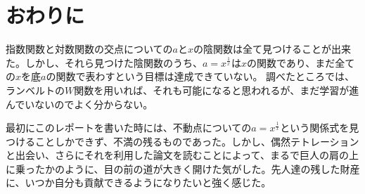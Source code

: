 \section{おわりに}

	指数関数と対数関数の交点についての$a$と$x$の陰関数は全て見つけることが出来た。しかし、それら見つけた陰関数のうち、$a=x^{\frac{1}{x}}$は$x$の関数であり、まだ全ての$x$を底$a$の関数で表わすという目標は達成できていない。
	調べたところでは、ランベルトの$W$関数を用いれば、それも可能になると思われるが、まだ学習が進んでいないのでよく分からない。
	
	最初にこのレポートを書いた時には、不動点についての$a=x^{\frac{1}{x}}$という関係式を見つけることしかできず、不満の残るものであった。しかし、偶然テトレーションと出会い、さらにそれを利用した論文を読むことによって、まるで巨人の肩の上に乗ったかのように、目の前の道が大きく開けた気がした。先人達の残した財産に、いつか自分も貢献できるようになりたいと強く感じた。